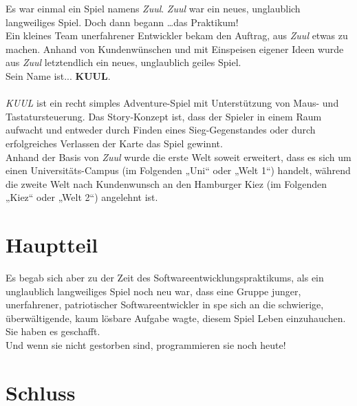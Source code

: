 \documentclass[12pt,twoside]{article}
\theoremstyle{plain}
\theoremstyle{definition}
\theoremstyle{remark}
\begin{document}
Es war einmal ein Spiel namens \textit{Zuul}.
\textit{Zuul} war ein neues, unglaublich langweiliges Spiel.
Doch dann begann \dots das Praktikum!\\
Ein kleines Team unerfahrener Entwickler bekam den Auftrag, aus \textit{Zuul} etwas zu machen.
Anhand von Kundenwünschen und mit Einspeisen eigener Ideen wurde aus \textit{Zuul} letztendlich ein neues, unglaublich geiles Spiel.\\
Sein Name ist... \textbf{KUUL}.\\
\\
\textit{KUUL} ist ein recht simples Adventure-Spiel mit Unterstützung von Maus- und Tastatursteuerung.
Das Story-Konzept ist, dass der Spieler in einem Raum aufwacht und entweder durch Finden eines Sieg-Gegenstandes oder durch erfolgreiches Verlassen der Karte das Spiel gewinnt.\\
Anhand der Basis von \textit{Zuul} wurde die erste Welt soweit erweitert, dass es sich um einen Universitäts-Campus (im Folgenden „Uni“ oder „Welt 1“) handelt, während die zweite Welt nach Kundenwunsch an den Hamburger Kiez  (im Folgenden „Kiez“ oder „Welt 2“) angelehnt ist.


\section{Hauptteil}
\label{sec:main}

Es begab sich aber zu der Zeit des Softwareentwicklungspraktikums, als ein unglaublich langweiliges Spiel noch neu war, dass eine Gruppe junger, unerfahrener, patriotischer Softwareentwickler in spe sich an die schwierige, überwältigende, kaum lösbare Aufgabe wagte, diesem Spiel Leben einzuhauchen.\\
Sie haben es geschafft.\\
Und wenn sie nicht gestorben sind, programmieren sie noch heute!

\section{Schluss}
\label{sec:end}
\end{document}
